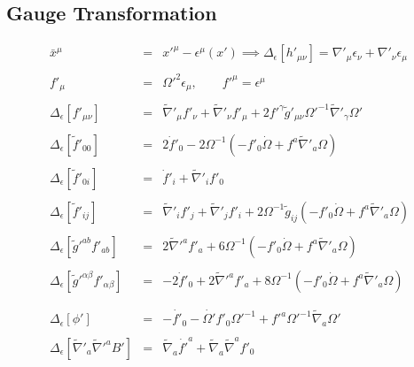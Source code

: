 \documentclass[10pt,letterpaper]{article}
\numberwithin{equation}{section}
\begin{document}
\subsection{Gauge Transformation}
\begin{eqnarray}
\bar x^\mu &=&  x'^\mu - \epsilon^\mu(x') \implies \Delta_\epsilon \left[ h'_{\mu\nu}\right] = \nabla'_\mu \epsilon_\nu +\nabla'_\nu \epsilon_\mu
\label{gaugetrans2}
\\ \nonumber\\
f'_{\mu} &=& \Omega'^2 \epsilon_\mu,\qquad f'^\mu = \epsilon^\mu
\\ \nonumber\\
\Delta_\epsilon\left[ f'_{\mu\nu} \right]  &=& \tilde\nabla'_{\mu }f'_{\nu} + \tilde\nabla'_{\nu}f'_{\mu} + 2 f'^{\gamma } \tilde g'_{\mu\nu} \Omega'^{-1} \tilde\nabla'_{\gamma }\Omega '
\\ \nonumber\\
\Delta_\epsilon\left[ \tilde f'_{00} \right] &=&  2\dot f'_0 - 2\Omega^{-1} \left( -f'_0 \dot \Omega + f^a\tilde\nabla'_a \Omega\right) 
\\ \nonumber\\
\Delta_\epsilon\left[ \tilde f'_{0i} \right]  &=&  \dot f'_i + \tilde\nabla'_i f'_0
\\ \nonumber\\
\Delta_\epsilon\left[ \tilde f'_{ij}  \right]  &=& \tilde\nabla'_{i }f'_{j } + \tilde\nabla'_{j}f'_{i} + 2\Omega^{-1} \tilde g_{ij} \left( -f'_0 \dot \Omega + f^a\tilde\nabla'_a \Omega\right) 
\\ \nonumber\\
\Delta_\epsilon\left[ \tilde g'^{ab} f'_{ab} \right]  &=& 2\tilde\nabla'^a f'_a + 6\Omega^{-1} \left( -f'_0 \dot \Omega + f^a\tilde\nabla'_a \Omega\right) 
\\ \nonumber\\
\Delta_\epsilon\left[ \tilde g'^{\alpha\beta} f'_{\alpha\beta} \right]  &=& -2\dot f'_0+ 2\tilde\nabla'^a f'_a + 8\Omega^{-1} \left( -f'_0 \dot \Omega + f^a\tilde\nabla'_a \Omega\right) 
\\ \nonumber\\
%
%
\nonumber\\
\Delta_\epsilon\left[ \phi' \right]&=& - \dot{f'}_{0}{} -  \dot{\Omega '} f'_{0}{} \Omega '^{-1} + f'^{a} \Omega '^{-1} \tilde{\nabla}_{a}\Omega '
\\ \nonumber\\
\Delta_\epsilon\left[ \tilde\nabla'_a\tilde\nabla'^a B' \right] &=&\tilde{\nabla}_{a}\dot{f'}^{a} + \tilde{\nabla}_{a}\tilde{\nabla}^{a}f'_{0}{}

\end{eqnarray}
\end{document}

